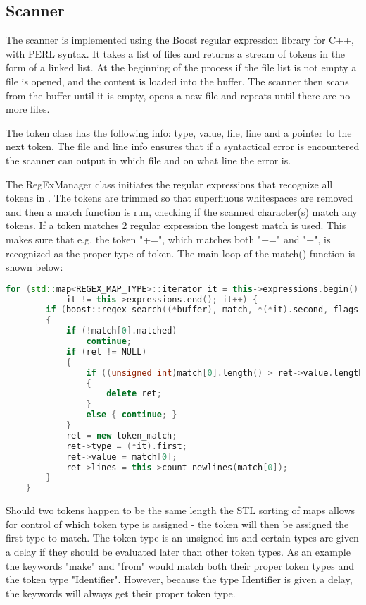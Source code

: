 \subsection{Scanner}
The scanner is implemented using the Boost regular expression library for C++, with PERL syntax. It takes a list of files and returns a stream of tokens in the form of a linked list. At the beginning of the process if the file list is not empty a file is opened, and the content is loaded into the buffer. The scanner then scans from the buffer until it is empty, opens a new file and repeats until there are no more files.

The token class has the following info: type, value, file, line and a pointer to the next token. The file and line info ensures that if a syntactical error is encountered the scanner can output in which file and on what line the error is. 

The RegExManager class initiates the regular expressions that recognize all tokens in \langname{}. The tokens are trimmed so that superfluous whitespaces are removed and then a match function is run, checking if the scanned character(s) match any tokens. If a token matches 2 regular expression the longest match is used. This makes sure that e.g. the token "+=", which matches both "+=" and "+", is recognized as the proper type of token. The main loop of the match() function is shown below:

\begin{lstlisting}[language = c++]
	for (std::map<REGEX_MAP_TYPE>::iterator it = this->expressions.begin();
			it != this->expressions.end(); it++) {
		if (boost::regex_search((*buffer), match, *(*it).second, flags))
		{
			if (!match[0].matched)
				continue;
			if (ret != NULL)
			{
				if ((unsigned int)match[0].length() > ret->value.length())
				{
					delete ret;
				}
				else { continue; }
			}
			ret = new token_match;
			ret->type = (*it).first;
			ret->value = match[0];
			ret->lines = this->count_newlines(match[0]);
		}
	}
\end{lstlisting}

Should two tokens happen to be the same length the \ac{STL} sorting of maps allows for control of which token type is assigned - the token will then be assigned the first type to match. The token type is an unsigned int and certain types are given a delay if they should be evaluated later than other token types. As an example the keywords "make" and "from" would match both their proper token types and the token type "Identifier". However, because the type Identifier is given a delay, the keywords will always get their proper token type.

